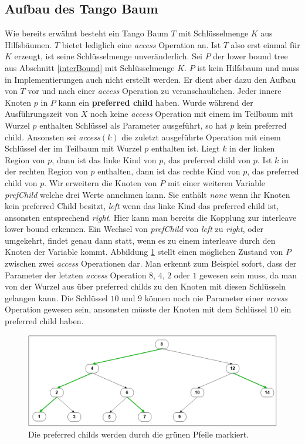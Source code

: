 \documentclass[a4paper,12pt]{article}
\begin{document}
\subsection{Aufbau des Tango Baum} \label{aufbauDesTango}
Wie bereits erwähnt besteht ein Tango Baum $T$ mit Schlüsselmenge $K$ aus Hilfsbäumen. $T$ bietet lediglich eine \textit{access} Operation an. Ist $T$ also erst einmal für $K$ erzeugt, ist seine Schlüsselmenge unveränderlich. Sei $P$ der lower bound tree aus Abschnitt \ref{interBound} mit Schlüsselmenge $K$. $P$ ist kein Hilfsbaum und muss in Implementierungen auch nicht erstellt werden. Er dient aber dazu den Aufbau von $T$ vor und nach einer \textit{access} Operation zu veranschaulichen. Jeder innere Knoten $p$ in $P$ kann ein \textbf{preferred child} haben.  Wurde während der Ausführungszeit von $X$ noch keine \textit{access} Operation mit einem im Teilbaum mit Wurzel $p$ enthalten Schlüssel als Parameter ausgeführt, so hat $p$ kein preferred child. Ansonsten sei \textit{access}$\left(k\right)$ die zuletzt ausgeführte Operation mit einem Schlüssel der im Teilbaum mit Wurzel $p$ enthalten ist. Liegt $k$ in der linken Region von $p$, dann ist das linke Kind von $p$, das preferred child von $p$. Ist $k$ in der rechten Region von $p$ enthalten, dann ist das rechte Kind von $p$, das preferred child von $p$. Wir erweitern die Knoten von $P$ mit einer weiteren Variable \textit{prefChild} welche drei Werte annehmen kann. Sie enthält \textit{none} wenn ihr Knoten kein preferred Child besitzt, \textit{left} wenn das linke Kind das preferred child ist, ansonsten entsprechend \textit{right}. Hier kann man bereits die Kopplung zur interleave lower bound erkennen. Ein Wechsel von \textit{prefChild}  von \textit{left} zu \textit{right}, oder umgekehrt, findet genau dann statt, wenn es zu einem interleave durch den Knoten der Variable kommt. Abbildung \ref{fig:prefChilds} stellt einen möglichen Zustand von $P$ zwischen zwei \textit{access} Operationen dar. Man erkennt zum Beispiel sofort, dass der Parameter der letzten \textit{access} Operation $8$, $4$, $2$ oder $1$ gewesen sein muss, da man von der Wurzel aus über preferred childs zu den Knoten mit diesen Schlüsseln gelangen kann. Die Schlüssel $10$ und $9$ können noch nie Parameter einer \textit{access} Operation gewesen sein, ansonsten müsste der Knoten mit dem Schlüssel $10$ ein preferred child haben. 

 \begin{figure}[h]
	\centering
	\includegraphics[width=1\textwidth]{"Medien/Tango/prefChilds"}
	\caption{Die preferred childs werden durch die grünen Pfeile markiert. }
	\label{fig:prefChilds}
\end{figure}
 
\end{document}

